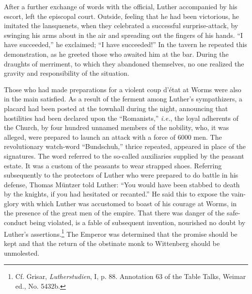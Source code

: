 After a further exchange of words with the official, Luther accompanied
by his escort, left the episcopal court. Outside, feeling
that he had been victorious, he imitated the lansquenets, when they
celebrated a successful surprise-attack, by swinging his arms about
in the air and spreading out the fingers of his hands. “I have succeeded,”
he exclaimed; “I have succeeded!” In the tavern he repeated this demonstration,
as he greeted those who awaited him at
the bar. During the draughts of merriment, to which they abandoned
themselves, no one realized the gravity and responsibility of the
situation.

Those who had made preparations for a violent coup d’état at
Worms were also in the main satisfied. As a result of the ferment
among Luther’s sympathizers, a placard had been posted at the townhall
during the night, announcing that hostilities had been declared
upon the “Romanists,” \textit{i.e.}, the loyal adherents of the Church, by
four hundred unnamed members of the nobility, who, it was alleged,
were prepared to launch an attack with a force of 6000 men. The
revolutionary watch-word “Bundschuh,” thrice repeated, appeared
in place of the signatures. The word referred to the so-called auxiliaries
supplied by the peasant estate. It was a custom of the peasants to
wear strapped shoes. Referring subsequently to the protectors of
Luther who were prepared to do battle in his defense, Thomas Müntzer
told Luther: “You would have been stabbed to death by the
knights, if you had hesitated or recanted.” He said this to
expose the vain-glory with which Luther was accustomed to boast of
his courage at Worms, in the presence of the great men
of the empire.
That there was danger of the safe-conduct being violated, is a fable
of subsequent invention, nourished no doubt by Luther’s assertions.\footnote
{Cf. Grisar, \textit{Lutherstudien}, I, p. 88. Annotation 63 of the Table Talks, Weimar ed., No.
5432b.}
The Emperor was determined that the promise should be kept and
that the return of the obstinate monk to Wittenberg should be
unmolested.

